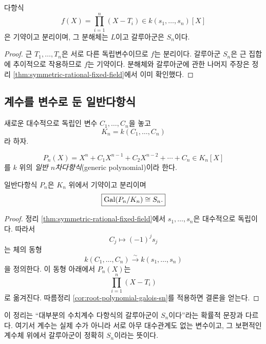 \begin{corollary}
\label{cor:root-polynomial-galois-sn}
다항식
\[
  f(X)=\prod_{i=1}^n(X-T_i)
  \in k(s_1,\dots,s_n)[X]
\]
은 기약이고 분리이며, 그 분해체는 $L$이고 갈루아군은 $S_n$이다.
\end{corollary}

\begin{proof}
근 $T_1,\dots,T_n$은 서로 다른 독립변수이므로 $f$는 분리이다. 갈루아군 $S_n$은 근 집합에 추이적으로 작용하므로 $f$는 기약이다. 분해체와 갈루아군에 관한 나머지 주장은 정리 \ref{thm:symmetric-rational-fixed-field}에서 이미 확인했다.
\end{proof}

\subsection{계수를 변수로 둔 일반다항식}

새로운 대수적으로 독립인 변수 $C_1,\dots,C_n$을 놓고
\[
  K_n=k(C_1,\dots,C_n)
\]
라 하자.

\begin{definition}[일반 $n$차다항식]
\label{def:generic-polynomial}
\[
  P_n(X)
  =X^n+C_1X^{n-1}+C_2X^{n-2}+\cdots+C_n
  \in K_n[X]
\]
를 $k$ 위의 \emph{일반 $n$차다항식}(generic polynomial)이라 한다.
\end{definition}

\begin{theorem}
\label{thm:generic-polynomial-galois-sn}
일반다항식 $P_n$은 $K_n$ 위에서 기약이고 분리이며
\[
  \boxed{\operatorname{Gal}(P_n/K_n)\cong S_n.}
\]
\end{theorem}

\begin{proof}
정리 \ref{thm:symmetric-rational-fixed-field}에서 $s_1,\dots,s_n$은 대수적으로 독립이다. 따라서
\[
  C_j\longmapsto(-1)^js_j
\]
는 체의 동형
\[
  k(C_1,\dots,C_n)
  \overset{\sim}{\longrightarrow}
  k(s_1,\dots,s_n)
\]
을 정의한다. 이 동형 아래에서 $P_n(X)$는
\[
  \prod_{i=1}^n(X-T_i)
\]
로 옮겨진다. 따름정리 \ref{cor:root-polynomial-galois-sn}를 적용하면 결론을 얻는다.
\end{proof}

\begin{remark}
이 정리는 ``대부분의 수치계수 다항식의 갈루아군이 $S_n$이다''라는 확률적 문장과 다르다. 여기서 계수는 실제 수가 아니라 서로 아무 대수관계도 없는 변수이고, 그 보편적인 계수체 위에서 갈루아군이 정확히 $S_n$이라는 뜻이다.
\end{remark}

